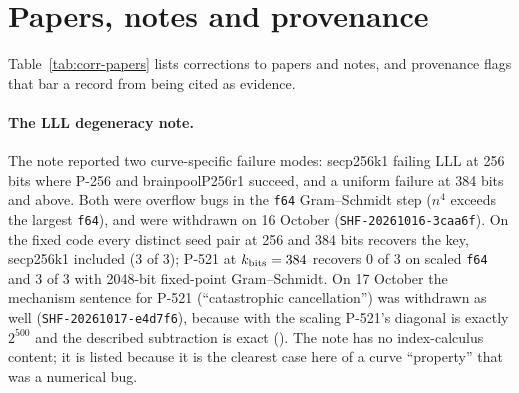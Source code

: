 \section{Papers, notes and provenance}\label{sec:corr-papers}

Table~\ref{tab:corr-papers} lists corrections to papers and notes, and
provenance flags that bar a record from being cited as evidence.

\paragraph{The LLL degeneracy note.} The note reported two curve-specific
failure modes: secp256k1 failing LLL at 256 bits where P-256 and
brainpoolP256r1 succeed, and a uniform failure at 384 bits and above. Both
were overflow bugs in the \texttt{f64} Gram--Schmidt step ($n^4$ exceeds the
largest \texttt{f64}), and were withdrawn on 16 October
(\texttt{SHF-20261016-3caa6f}). On the fixed code every distinct seed pair at
256 and 384 bits recovers the key, secp256k1 included (3 of 3); P-521 at
$k_{\rm bits}=384$ recovers 0 of 3 on scaled \texttt{f64} and 3 of 3 with
2048-bit fixed-point Gram--Schmidt. On 17 October the mechanism sentence for
P-521 (``catastrophic cancellation'') was withdrawn as well
(\texttt{SHF-20261017-e4d7f6}), because with the scaling P-521's diagonal is
exactly $2^{500}$ and the described subtraction is exact
(). The note has no index-calculus
content; it is listed because it is the clearest case here of a curve
``property'' that was a numerical bug.

